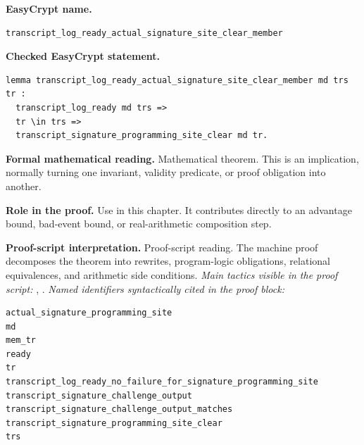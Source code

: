 \begin{formaltheorem}
\noindent\textbf{EasyCrypt name.}
\begin{lstlisting}[language=EasyCrypt,basicstyle=\ttfamily\scriptsize]
transcript_log_ready_actual_signature_site_clear_member
\end{lstlisting}
\noindent\textbf{Checked EasyCrypt statement.}
\begin{lstlisting}[language=EasyCrypt,basicstyle=\ttfamily\scriptsize]
lemma transcript_log_ready_actual_signature_site_clear_member md trs tr :
  transcript_log_ready md trs =>
  tr \in trs =>
  transcript_signature_programming_site_clear md tr.
\end{lstlisting}
\noindent\textbf{Formal mathematical reading.}
Mathematical theorem. This is an implication, normally turning one invariant, validity predicate, or proof obligation into another.

\noindent\textbf{Role in the proof.}
Use in this chapter. It contributes directly to an advantage bound, bad-event bound, or real-arithmetic composition step.

\noindent\textbf{Proof-script interpretation.}
Proof-script reading. The machine proof decomposes the theorem into rewrites, program-logic obligations, relational equivalences, and arithmetic side conditions.
\emph{Main tactics visible in the proof script:} , .
\emph{Named identifiers syntactically cited in the proof block:}
\begin{lstlisting}[language=EasyCrypt,basicstyle=\ttfamily\scriptsize]
actual_signature_programming_site
md
mem_tr
ready
tr
transcript_log_ready_no_failure_for_signature_programming_site
transcript_signature_challenge_output
transcript_signature_challenge_output_matches
transcript_signature_programming_site_clear
trs
\end{lstlisting}

\end{formaltheorem}

